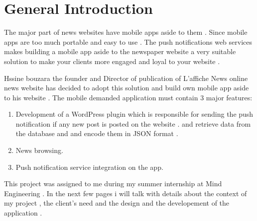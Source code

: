 \chapter*{General Introduction}





The major part of news websites have mobile apps aside to them . Since mobile apps are too much portable and easy to use . The push notifications  web services makes building a mobile app  aside to the newspaper website a very suitable solution to make your clients more engaged and loyal to your website . 
 
Hssine bouzara the founder and Director of publication of L'affiche News online news website  has decided to adopt this solution and build own mobile app aside to his website . The mobile demanded application must contain 3 major features: 

\begin{enumerate}
  \item Development of a WordPress plugin which is responsible for sending the push notification if any new post is posted on the website . and retrieve data from the database and and encode  them in JSON format . 
  \item News browsing.
  \item Push notification service integration on the app. 
\end{enumerate}

This project was assigned to me during my summer internship at Mind Engineering .
In the next few pages i will talk with details about the context of my project , the client's need and the design and the developement of the application .

 


	
 

